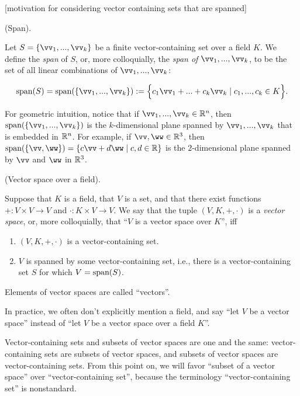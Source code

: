 [motivation for considering vector containing sets that are spanned]

\begin{defn}
    (Span).
    
    Let $S = \{\vv_1, ..., \vv_k\}$ be a finite vector-containing set over a field $K$. We define the \textit{span} of $S$, or, more colloquially, the \textit{span of $\vv_1, ..., \vv_k$}, to be the set of all linear combinations of $\vv_1, ..., \vv_k$:
    
     \begin{align*}
        \spann(S) = \spann(\{\vv_1, ..., \vv_k\}) := \Big\{ c_1 \vv_1 + ... + c_k \vv_k \mid c_1, ..., c_k \in K \Big\}.
    \end{align*}
    
    For geometric intuition, notice that if $\vv_1, ..., \vv_k \in \R^n$, then $\spann(\{\vv_1, ..., \vv_k\})$ is the $k$-dimensional plane spanned by $\vv_1, ..., \vv_k$ that is embedded in $\mathbb{R}^n$. For example, if $\vv, \ww \in \R^3$, then ${\spann(\{\vv, \ww\}) = \{ c \vv + d \ww \mid c, d \in \R \}}$ is the $2$-dimensional plane spanned by $\vv$ and $\ww$ in $\mathbb{R}^3$.
\end{defn}

\begin{defn}
\label{ch::lin_alg::defn::vector_space}
    (Vector space over a field).
    
    Suppose that $K$ is a field, that $V$ is a set, and that there exist functions $+:V \times V \rightarrow V$ and $\cdot:K \times V \rightarrow V$. We say that the tuple $(V, K, +, \cdot)$ is a \textit{vector space}, or, more colloquially, that ``$V$ is a vector space over $K$'', iff 

    \begin{enumerate}
        \item $(V, K, +, \cdot)$ is a vector-containing set.
        \item $V$ is spanned by some vector-containing set, i.e., there is a vector-containing set $S$ for which $V = \text{span}(S)$. 
    \end{enumerate}
    
    Elements of vector spaces are called ``vectors''.
    
    In practice, we often don't explicitly mention a field, and say ``let $V$ be a vector space'' instead of ``let $V$ be a vector space over a field $K$''.
\end{defn}

\begin{remark}
    Vector-containing sets and subsets of vector spaces are one and the same: vector-containing sets are subsets of vector spaces, and subsets of vector spaces are vector-containing sets. From this point on, we will favor ``subset of a vector space'' over ``vector-containing set'', because the terminology ``vector-containing set'' is nonstandard.
\end{remark}

